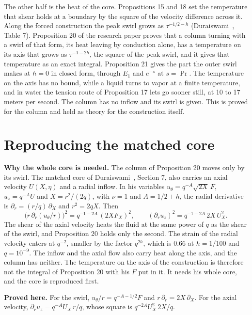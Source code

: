 The other half is the heat of the core. Propositions 15 and 18 set the temperature that shear holds
at a boundary by the square of the velocity difference across it. Along the forced construction
the peak swirl grows as $\tau^{-1/2-h}$ (Duraiswami~\cite{src:Duraiswami-2026}, Table 7).
Proposition 20 of the research paper proves that a column turning with a swirl of that form, its
heat leaving by conduction alone, has a temperature on its axis that grows as $\tau^{-1-2h}$, the
square of the peak swirl, and it gives that temperature as an exact integral. Proposition 21 gives
the part the outer swirl makes at $h = 0$ in closed form, through $E_1$ and $e^{-s}$ at
$s = \Pr$. The temperature on the axis has no bound, while a liquid turns to vapor at a finite
temperature, and in water the tension route of Proposition 17 lets go sooner still, at 10 to 17
meters per second. The column has no inflow and its swirl is given. This is proved for the column
and held as theory for the construction itself.

\section{Reproducing the matched core}

\textbf{Why the whole core is needed.} The column of Proposition 20 moves only by its swirl.
The matched core of Duraiswami~\cite{src:Duraiswami-2026}, Section 7, also carries an axial
velocity $U(X,\eta)$ and a radial inflow. In his variables $u_\theta = q^{-A}\sqrt{2X}\,F$,
$u_z = q^{-A}U$ and $X = r^2/(2q)$, with $\nu = 1$ and $A = 1/2 + h$, the radial derivative is
$\partial_r = (r/q)\,\partial_X$ and $r^2 = 2qX$. Then
\[
\bigl(r\,\partial_r(u_\theta/r)\bigr)^2 = q^{-1-2A}\,(2XF_X)^2,
\qquad
(\partial_r u_z)^2 = q^{-1-2A}\,2X\,U_X^2 .
\]
The shear of the axial velocity heats the fluid at the same power of $q$ as the shear of the
swirl, and Proposition 20 holds only the second. The strain of the radial velocity enters at
$q^{-2}$, smaller by the factor $q^{2h}$, which is $0.66$ at $h = 1/100$ and $q = 10^{-9}$. The
inflow and the axial flow also carry heat along the axis, and the column has neither. The
temperature on the axis of the construction is therefore not the integral of Proposition 20 with
his $F$ put in it. It needs his whole core, and the core is reproduced first.

\textbf{Proved here.} For the swirl, $u_\theta/r = q^{-A-1/2}F$ and $r\,\partial_r = 2X\,\partial_X$. For
the axial velocity, $\partial_r u_z = q^{-A}U_X\,r/q$, whose square is $q^{-2A}U_X^2\,2X/q$.

